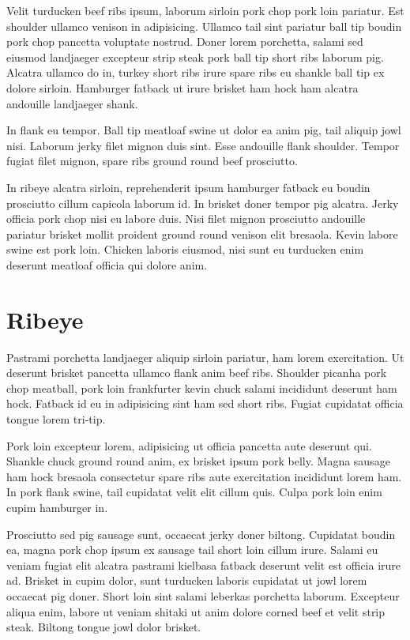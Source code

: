 \documentclass[a4paper,10pt]{article}
\begin{document}
Velit turducken beef ribs ipsum, laborum sirloin pork chop pork loin pariatur. Est shoulder ullamco venison in adipisicing. Ullamco tail sint pariatur ball tip boudin pork chop pancetta voluptate nostrud. Doner lorem porchetta, salami sed eiusmod landjaeger excepteur strip steak pork ball tip short ribs laborum pig. Alcatra ullamco do in, turkey short ribs irure spare ribs eu shankle ball tip ex dolore sirloin. Hamburger fatback ut irure brisket ham hock ham alcatra andouille landjaeger shank.

In flank eu tempor. Ball tip meatloaf swine ut dolor ea anim pig, tail aliquip jowl nisi. Laborum jerky filet mignon duis sint. Esse andouille flank shoulder. Tempor fugiat filet mignon, spare ribs ground round beef prosciutto.

In ribeye alcatra sirloin, reprehenderit ipsum hamburger fatback eu boudin prosciutto cillum capicola laborum id. In brisket doner tempor pig alcatra. Jerky officia pork chop nisi eu labore duis. Nisi filet mignon prosciutto andouille pariatur brisket mollit proident ground round venison elit bresaola. Kevin labore swine est pork loin. Chicken laboris eiusmod, nisi sunt eu turducken enim deserunt meatloaf officia qui dolore anim.

\section{Ribeye}

Pastrami porchetta landjaeger aliquip sirloin pariatur, ham lorem exercitation. Ut deserunt brisket pancetta ullamco flank anim beef ribs. Shoulder picanha pork chop meatball, pork loin frankfurter kevin chuck salami incididunt deserunt ham hock. Fatback id eu in adipisicing sint ham sed short ribs. Fugiat cupidatat officia tongue lorem tri-tip.

Pork loin excepteur lorem, adipisicing ut officia pancetta aute deserunt qui. Shankle chuck ground round anim, ex brisket ipsum pork belly. Magna sausage ham hock bresaola consectetur spare ribs aute exercitation incididunt lorem ham. In pork flank swine, tail cupidatat velit elit cillum quis. Culpa pork loin enim cupim hamburger in.

Prosciutto sed pig sausage sunt, occaecat jerky doner biltong. Cupidatat boudin ea, magna pork chop ipsum ex sausage tail short loin cillum irure. Salami eu veniam fugiat elit alcatra pastrami kielbasa fatback deserunt velit est officia irure ad. Brisket in cupim dolor, sunt turducken laboris cupidatat ut jowl lorem occaecat pig doner. Short loin sint salami leberkas porchetta laborum. Excepteur aliqua enim, labore ut veniam shitaki ut anim dolore corned beef et velit strip steak. Biltong tongue jowl dolor brisket.
\end{document}
